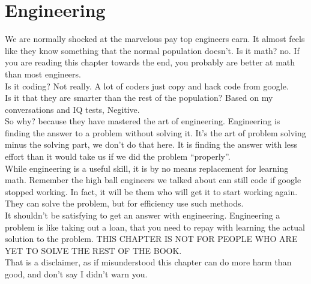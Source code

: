 \chapter{Engineering}
We are normally shocked at the marvelous pay top engineers earn. It almost feels like they know something that the normal population doesn't. Is it math? no. If you are reading this chapter towards the end, you probably are better at math than most engineers.\\
Is it coding? Not really. A lot of coders just copy and hack code from google.\\
Is it that they are smarter than the rest of the population? Based on my conversations and IQ tests, Negitive.\\
So why? because they have  mastered the art of engineering. Engineering is finding the answer to a problem without solving it. It’s the art of problem solving minus the solving part, we don't do that here. It is finding the answer with less effort than it would take us if we did the problem “properly”.\\
While engineering is a useful skill, it is by no means replacement for learning math. Remember the high ball engineers we talked about can still code if google stopped working. In fact, it will be them who will get it to start working again. They can solve the problem, but for efficiency use such methods.\\
It shouldn’t be satisfying to get an answer with engineering. Engineering a problem is like taking out a loan, that you need to repay with learning the actual solution to the problem. THIS CHAPTER IS NOT FOR PEOPLE WHO ARE YET TO SOLVE THE REST OF THE BOOK.\\
That is a disclaimer, as if misunderstood this chapter can do more harm than good, and don’t say I didn’t warn you.\\
